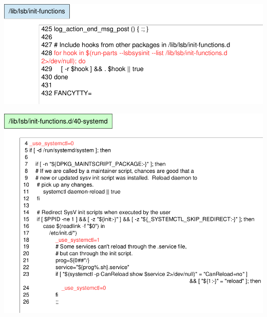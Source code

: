 \begin{frame}
\begin{center}
\includegraphics[width=1\hsize]{image201510/daemonscript1.png}
\end{center}
\end{frame}

\begin{frame}
\begin{center}
\includegraphics[width=1\hsize]{image201510/daemonscript2.png}
\end{center}
\end{frame}

